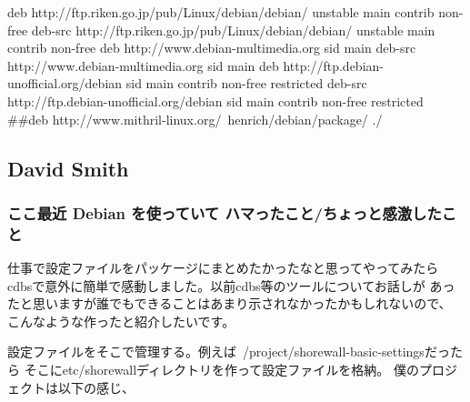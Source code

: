 \documentclass[mingoth,a4paper]{jsarticle}
\begin{document}
\begin{commandline}
 deb http://ftp.riken.go.jp/pub/Linux/debian/debian/ unstable main
 contrib non-free
 deb-src http://ftp.riken.go.jp/pub/Linux/debian/debian/ unstable main
 contrib non-free
 deb http://www.debian-multimedia.org sid main
 deb-src http://www.debian-multimedia.org sid main
 deb http://ftp.debian-unofficial.org/debian sid main contrib non-free
 restricted
 deb-src http://ftp.debian-unofficial.org/debian sid main contrib
 non-free restricted
 ##deb http://www.mithril-linux.org/~henrich/debian/package/ ./
\end{commandline}

\subsection{David Smith}


\subsubsection{ここ最近 Debian を使っていて ハマったこと/ちょっと感激したこと}
仕事で設定ファイルをパッケージにまとめたかったなと思ってやってみたら
cdbsで意外に簡単で感動しました。以前cdbs等のツールについてお話しが
あったと思いますが誰でもできることはあまり示されなかったかもしれないので、
こんなような作ったと紹介したいです。

設定ファイルをそこで管理する。例えば~/project/shorewall-basic-settingsだったら
そこにetc/shorewallディレクトリを作って設定ファイルを格納。
僕のプロジェクトは以下の感じ、

\end{document}
